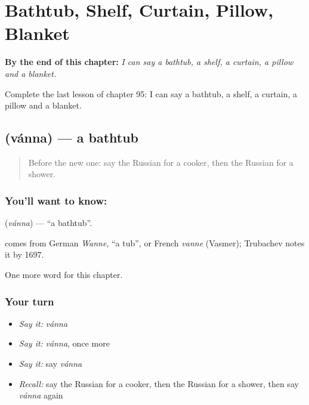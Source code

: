 
\chapter{Bathtub, Shelf, Curtain, Pillow, Blanket}
\label{ch:ru-bathtub-shelf-curtain-pillow-blanket}

\begin{chapteropening}
\textbf{By the end of this chapter:} \emph{I can say a bathtub, a shelf, a curtain, a pillow and a blanket.}

Complete the last lesson of chapter 95: I can say a bathtub, a shelf, a curtain, a pillow and a blanket.
\end{chapteropening}

\section[\texorpdfstring{\ru{ванна} (vánna)}{ванна (vánna)}]{ (vánna) — a bathtub}

\label{lesson:RU-C95-bathtub}



\begin{quote}
Before the new one: say the Russian for a cooker, then the Russian for a shower.
\end{quote}

\subsection*{You'll want to know: }
\textbf{} (\emph{vánna}) — \textquotedblleft{}a bathtub\textquotedblright{}.

\begin{cousinweb}
\textbf{} comes from German \emph{Wanne}, \textquotedblleft{}a tub\textquotedblright{}, or French \emph{vanne} (Vasmer); Trubachev notes it by 1697.
\end{cousinweb}

\begin{grammarlens}[title={What you've built}]
One more word for this chapter.
\end{grammarlens}

\subsection*{Your turn}
\begin{itemize}
\raggedright
  \item \emph{Say it:} \emph{vánna}
  \item \emph{Say it:} \emph{vánna}, once more
  \item \emph{Say it:} say \emph{vánna}
  \item \emph{Recall:} say the Russian for a cooker, then the Russian for a shower, then say \emph{vánna} again
\end{itemize}

